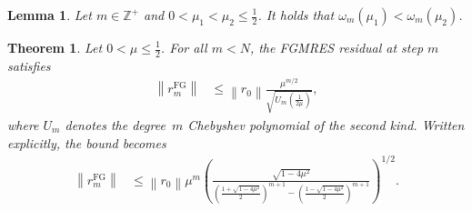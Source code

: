 \documentclass[10pt,a4paper]{amsart}
\newtheorem{lemma}{Lemma}
\newtheorem{theorem}{Theorem}
\def\Z{\mathbb{Z}}
\begin{document}
\begin{lemma} \label{lem:monotonic_in_mu}
    Let $m \in \Z^+$ and $0<\mu_1 < \mu_2 \leq \frac{1}{2}$. It holds that $\omega_m(\mu_1) < \omega_m(\mu_2)$.
\end{lemma}

\begin{theorem} \label{thm:explicit_bound}
    Let $0 < \mu \leq \frac{1}{2}$. For all $m<N$, the FGMRES residual at step $m$ satisfies
    \begin{align} \label{eq:cheb_bound}
        \left\|r_m^{\mathrm{FG}}\right\| & \leq \left\|r_0\right\| \frac{\mu^{m/2}}{\sqrt{U_m\left(\frac{1}{2\mu}\right)}},
    \end{align}
    where $U_m$ denotes the degree~$m$ Chebyshev polynomial of the second kind.
    Written explicitly, the bound becomes 
    \begin{align} \label{eq:explicit_bound}
        \left\|r_m^{\mathrm{FG}}\right\| & \leq \left\|r_0\right\| \mu^m \left( \frac{\sqrt{1 - 4\mu^2}}{\left( \frac{1 + \sqrt{1 - 4\mu^2}}{2} \right)^{m+1} - \left( \frac{1 - \sqrt{1 - 4\mu^2}}{2} \right)^{m+1}} \right)^{1/2}.
    \end{align}
\end{theorem}
\end{document}
